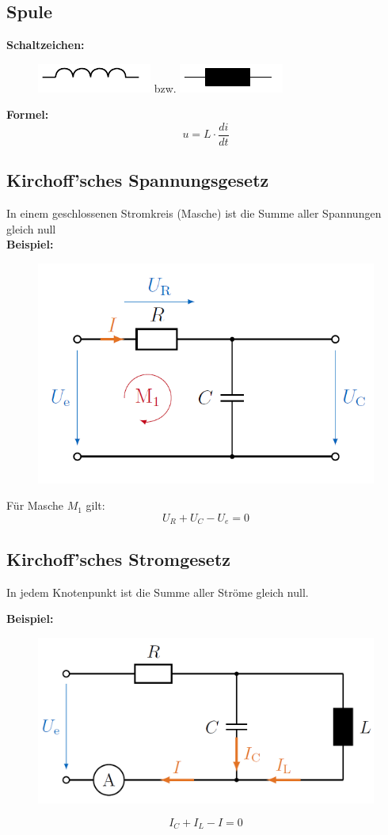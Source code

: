 \documentclass[10pt,a4paper]{article}
\begin{document}
\subsection{Spule}
\textbf{Schaltzeichen:} \\
\begin{figure}[H]
	\includegraphics[width=0.1\columnwidth]{imgs/spule.pdf} bzw. 
	\includegraphics[width=0.1\columnwidth]{imgs/spule_alt.pdf}	
\end{figure}
\textbf{Formel:}
$$
	u = L ⋅ \frac{di}{dt}
$$

\subsection{Kirchoff'sches Spannungsgesetz}
In einem geschlossenen Stromkreis (Masche) ist die Summe aller Spannungen gleich null \\

\textbf{Beispiel:}
\begin{figure}[H]
	\includegraphics[width=0.5\columnwidth]{imgs/kvl.png}
\end{figure}
Für Masche $M_1$ gilt:
$$
U_R + U_C - U_e = 0
$$

\subsection{Kirchoff'sches Stromgesetz}
In jedem Knotenpunkt ist die Summe aller Ströme gleich null.

\textbf{Beispiel:}
\begin{figure}[H]
	\includegraphics[width=0.5\columnwidth]{imgs/kcl.png}
\end{figure}
$$
	I_C + I_L - I = 0
$$
\end{document}
